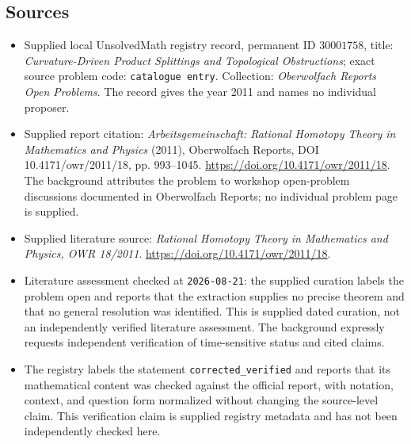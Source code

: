 \documentclass[11pt]{article}
\begin{document}
\subsection{Sources}
\begin{itemize}
\item Supplied local UnsolvedMath registry record, permanent ID \(30001758\), title: \emph{Curvature-Driven Product Splittings and Topological Obstructions}; exact source problem code: \texttt{catalogue entry}. Collection: \emph{Oberwolfach Reports Open Problems}. The record gives the year 2011 and names no individual proposer.
\item Supplied report citation: \emph{Arbeitsgemeinschaft: Rational Homotopy Theory in Mathematics and Physics} (2011), Oberwolfach Reports, DOI 10.4171/owr/2011/18, pp. 993--1045. \url{https://doi.org/10.4171/owr/2011/18}. The background attributes the problem to workshop open-problem discussions documented in Oberwolfach Reports; no individual problem page is supplied.
\item Supplied literature source: \emph{Rational Homotopy Theory in Mathematics and Physics, OWR 18/2011}. \url{https://doi.org/10.4171/owr/2011/18}.
\item Literature assessment checked at \texttt{2026-08-21}: the supplied curation labels the problem open and reports that the extraction supplies no precise theorem and that no general resolution was identified. This is supplied dated curation, not an independently verified literature assessment. The background expressly requests independent verification of time-sensitive status and cited claims.
\item The registry labels the statement \texttt{corrected\_verified} and reports that its mathematical content was checked against the official report, with notation, context, and question form normalized without changing the source-level claim. This verification claim is supplied registry metadata and has not been independently checked here.
\end{itemize}
\end{document}
